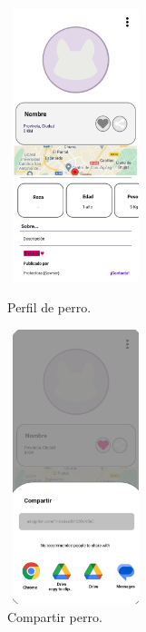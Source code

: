 \documentclass[a4paper, 12pt]{article}
\begin{document}
\begin{figure}[H]
   	\begin{minipage}{0.48\textwidth}
		\begin{center}
			{\includegraphics[height=8cm, width=4cm]{DogProfile.jpg}\par}
			\caption{Perfil de perro.}
			\medskip
		\end{center}  
	\end{minipage}\hfill
   	\begin{minipage}{0.48\textwidth}
		\begin{center}
			{\includegraphics[height=8cm, width=4cm]{ShareAction.jpg}\par}
			\caption{Compartir perro.}
			\medskip
		\end{center}  
	\end{minipage}\hfill
\end{figure}
\end{document}
